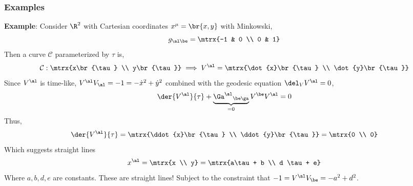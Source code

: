 \documentclass{article}
\begin{document}
\subsubsection{Examples}
\textbf{Example}: Consider $\R^2$ with Cartesian coordinates $x^\mu = \br{x,y}$ with Minkowski,
\[ g_{\al\be} = \mtrx{-1 & 0 \\ 0 & 1} \]
Then a curve $\mathcal{C}$ parameterized by $\tau$ is,
\[ \mathcal{C} : \mtrx{x\br{\tau} \\ y\br{\tau}} \implies V^\al = \mtrx{\dot{x}\br{\tau} \\ \dot{y}\br{\tau}} \]
Since $V^\al$ is time-like, $V^\al V_\al = -1 = -\dot{x}^2 + \dot{y}^2$ combined with the geodesic equation $\del_VV^\al = 0$,
\[ \der{V^\al}{\tau} + \underbrace{{\Ga^\al}_{\be\ga}}_{=0} V^\be V^\al = 0 \]
Thus,
\[ \der{V^\al}{\tau} = \mtrx{\ddot{x}\br{\tau} \\ \ddot{y}\br{\tau}} = \mtrx{0 \\ 0}\]
Which suggests straight lines
\[ x^\al = \mtrx{x \\ y} = \mtrx{a\tau + b \\ d \tau + e}\]
Where $a,b,d,e$ are constants. These are straight lines! Subject to the constraint that $-1 = V^\al V_\be = -a^2 + d^2$. \\
\end{document}
